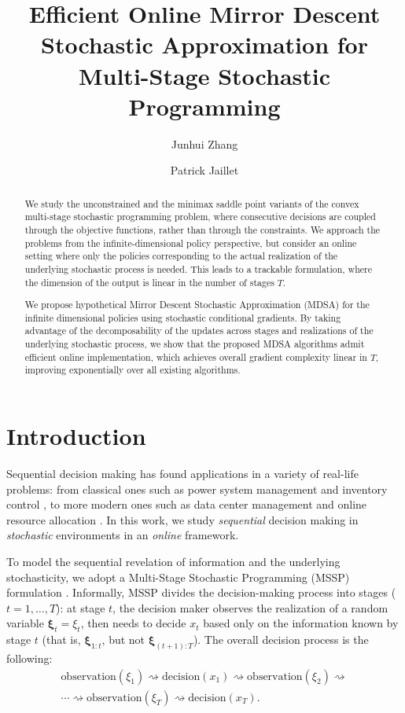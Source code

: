 \documentclass[11pt,fullpage,letterpaper]{article}
\title{Efficient Online Mirror Descent Stochastic Approximation for Multi-Stage Stochastic Programming}
\author[1]{Junhui Zhang}
\author[1,2]{Patrick Jaillet}
\affil[1]{Operations Research Center, MIT}
\affil[2]{Department of Electrical Engineering and Computer Science, MIT}
\date{}
\newcommand{\bx}{\boldsymbol{\xi}}
\begin{document}
\maketitle

\begin{abstract}
    We study the unconstrained and the minimax saddle point variants of the convex multi-stage stochastic programming problem, where consecutive decisions are coupled through the objective functions, rather than through the constraints. We approach the problems from the infinite-dimensional policy perspective, but consider an online setting where only the policies corresponding to the actual realization of the underlying stochastic process is needed. This leads to a trackable formulation, where the dimension of the output is linear in the number of stages $T$. 

We propose hypothetical Mirror Descent Stochastic Approximation (MDSA) for the infinite dimensional policies using stochastic conditional gradients. By taking advantage of the decomposability of the updates across stages and realizations of the underlying stochastic process, we show that the proposed MDSA algorithms admit efficient online implementation, which achieves overall gradient complexity linear in $T$, improving exponentially over all existing algorithms.
\end{abstract}




\section{Introduction}




Sequential decision making has found applications in a variety of real-life problems: from classical ones such as power system management \cite{Bhattacharya2018, Lu2020,pereira_multi-stage_1991} and inventory control \cite{LanShapiro2024,Shapiro2021Lectures}, to more modern ones such as data center management \cite{ChenComdenLiuGandhiWierman2016,Lin2012,LinWiermanAndrewThereska2011} and online resource allocation \cite{BalseiroLuMirrokni2023,Vera2021Bayesian,Xie2024Benefits}. In this work, we study \textit{sequential} decision making in \textit{stochastic} environments in an \textit{online} framework. 

To model the sequential revelation of information and the underlying stochasticity, we adopt a Multi-Stage Stochastic Programming (MSSP) formulation \cite{Shapiro2021Lectures}. Informally, MSSP divides the decision-making process into stages ($t=1,\ldots,T$): at stage $t$, the decision maker observes the realization of a random variable $\bx_t=\xi_t$, then needs to decide $x_t$ based only on the information known by stage $t$ (that is, $\bx_{1:t}$, but not $\bx_{(t+1):T}$). The overall decision process is the following:
\begin{align*}
    \text{observation}(\xi_1) \rightsquigarrow \text{decision}(x_1) \rightsquigarrow \text{observation}(\xi_2) \rightsquigarrow \\
    \cdots \rightsquigarrow \text{observation}(\xi_T) \rightsquigarrow \text{decision}(x_T). 
\end{align*}
\end{document}
